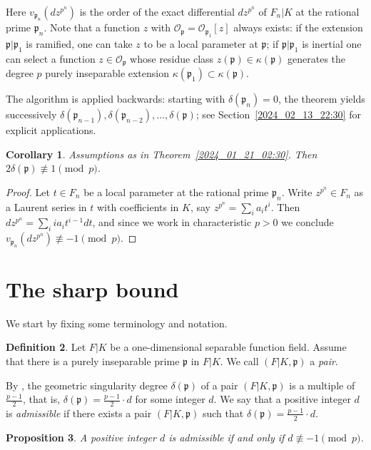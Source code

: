 \documentclass[12pt,reqno]{amsart}%
\newtheorem{prop}{Proposition}[section]
\newtheorem{cor}[prop]{Corollary}
\theoremstyle{definition}
\newtheorem{defn}[prop]{Definition}
\theoremstyle{remark}
\newcommand{\su}{\subset}
\newcommand{\OO}{\mathcal{O}}
\newcommand{\pp}{\mathfrak{p}}
\newcommand{\de}{\delta}
\newcommand{\ka}{\kappa}
\begin{document}
Here $v_{\pp_n} (dz^{p^n})$ is the order of the exact differential $dz^{p^n}$ of $F_n|K$ at the rational prime $\pp_n$.
Note that a function $z$ with $\OO_\pp = \OO_{\pp_1}[z]$ always exists:
if the extension $\pp|\pp_1$ is ramified, one can take $z$ to be a local parameter at $\pp$;
if $\pp|\pp_1$ is inertial one can select a function $z\in \OO_\pp$ whose residue class $z(\pp)\in \ka(\pp)$ generates the degree $p$ purely inseparable extension $\ka(\pp_1)\su\ka(\pp)$.

The algorithm is applied backwards: starting with $\de(\pp_n)=0$, the theorem yields successively $\de(\pp_{n-1}),\de(\pp_{n-2}),\dots,\de(\pp)$; see Section~\ref{2024_02_13_22:30} for explicit applications.

\begin{cor} \label{2025_06_17_19:00}
Assumptions as in Theorem~\ref{2024_01_21_02:30}.
Then $2\de(\pp) \not \equiv 1 \pmod p$.
\end{cor}

\begin{proof}
Let $t\in F_n$ be a local parameter at the rational prime $\pp_n$.
Write $z^{p^n} \in F_n$ as a Laurent series in $t$ with coefficients in $K$, say $z^{p^n}=\sum_i a_i t^i$.
Then $d z^{p^n}=\sum_i i a_i t^{i-1} dt$,
and since we work in characteristic $p>0$ we conclude $v_{\pp_n}(dz^{p^n}) \not \equiv -1 \pmod p$.
\end{proof}

\section{The sharp bound} \label{2023_07_05_21:20}

We start by fixing some terminology and notation.

\begin{defn}
Let $F|K$ be a one-dimensional separable function field.
Assume that there is a purely inseparable prime $\pp$ in $F|K$.
We call $(F|K,\pp)$ a \emph{pair}.
\end{defn}

By \cite[Proposition~2.5]{HiSt22}, the geometric singularity degree $\de(\pp)$ of a pair $(F|K,\pp)$ is a multiple of $\frac{p-1}2$, that is, $\de(\pp) = \frac{p-1}2 {\cdot}d$ for some integer $d$. 
We say that a positive integer $d$ is \textit{admissible} if there exists a pair $(F|K,\pp)$ such that $\de(\pp) = \frac{p-1}{2} {\cdot} d$.

\begin{prop}\label{2023_07_14_13:25}
    A positive integer $d$ is admissible if and only if $d\not\equiv -1 \pmod p$.
\end{prop}
\end{document}

